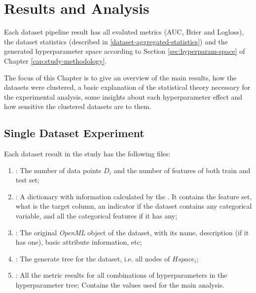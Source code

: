 \chapter{Results and Analysis}
\label{cap:results}

Each dataset pipeline result has all evaluted metrics (AUC, Brier and Logloss), the dataset statistics (described in \ref{dataset-aggregated-statistics}) and the generated hyperparameter space according to Section \ref{sec:hyperparam-space} of Chapter \ref{cap:study-methodology}.

The focus of this Chapter is to give an overview of the main results, how the datasets were clustered, a basic explanation of the statistical theory necessary for the experimental analysis,  some insights about each hyperparameter effect and how sensitive the clustered datasets are to them.


\section{Single Dataset Experiment}
\label{sec:single-dataset}

Each dataset result in the study has the following files:

\begin{enumerate}
    \item \textbf{}: The number of data points $D_i$ and the number of features of both train and test set;
    \item \textbf{}: A dictionary with information calculated by the . It contains the feature set, what is the target column, an indicator if the dataset contains any categorical variable, and all the categorical features if it has any;
    \item \textbf{}: The original \textit{OpenML} object of the dataset, with its name, description (if it has one), basic attribute information, etc;
    \item \textbf{}: The generate tree for the dataset, i.e. all nodes of $Hspace_i$;
    \item \textbf{}: All the metric results for all combinations of hyperparameters in the hyperparameter tree; Contains the values used for the main analysis.
\end{enumerate}

